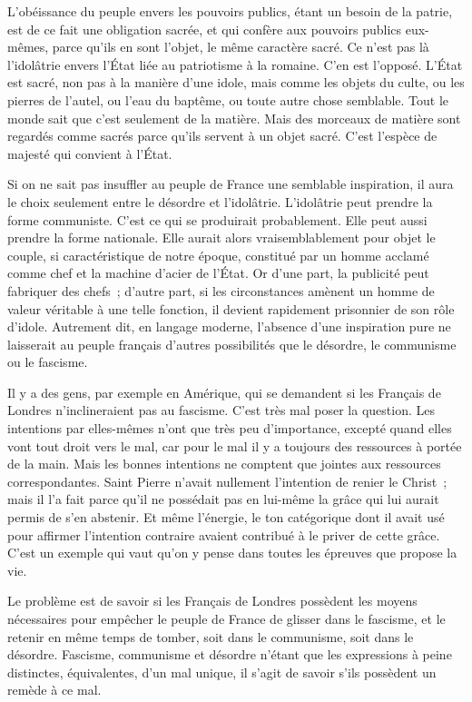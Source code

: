 \documentclass[french,twoside]{book} %
\begin{document}
L'obéissance du peuple envers les pouvoirs publics, étant un besoin de la patrie, est de ce fait une obligation sacrée, et qui confère aux pouvoirs publics eux-mêmes, parce qu'ils en sont l'objet, le même caractère sacré. Ce n'est pas là l'idolâtrie envers l'État liée au patriotisme à la romaine. C'en est l'opposé. L'État est sacré, non pas à la manière d'une idole, mais comme les objets du culte, ou les pierres de l'autel, ou l'eau du baptême, ou toute autre chose semblable. Tout le monde sait que c'est seulement de la matière. Mais des morceaux de matière sont regardés comme sacrés parce qu'ils servent à un objet sacré. C'est l'espèce de majesté qui convient à l'État.\par
Si on ne sait pas insuffler au peuple de France une semblable inspiration, il aura le choix seulement entre le désordre et l'idolâtrie. L'idolâtrie peut prendre la forme communiste. C'est ce qui se produirait probablement. Elle peut aussi prendre la forme nationale. Elle aurait alors vraisemblablement pour objet le couple, si caractéristique de notre époque, constitué par un homme acclamé comme chef et la machine d'acier de l'État. Or d'une part, la publicité peut fabriquer des chefs ; d'autre part, si les circonstances amènent un homme de valeur véritable à une telle fonction, il devient rapidement prisonnier de son rôle d'idole. Autrement dit, en langage moderne, l'absence d'une inspiration pure ne laisserait au peuple français d'autres possibilités que le désordre, le communisme ou le fascisme.\par
Il y a des gens, par exemple en Amérique, qui se demandent si les Français de Londres n'inclineraient pas au fascisme. C'est très mal poser la question. Les intentions par elles-mêmes n'ont que très peu d'importance, excepté quand elles vont tout droit vers le mal, car pour le mal il y a toujours des ressources à portée de la main. Mais les bonnes intentions ne comptent que jointes aux ressources correspondantes. Saint Pierre n'avait nullement l'intention de renier le Christ ; mais il l'a fait parce qu'il ne possédait pas en lui-même la grâce qui lui aurait permis de s'en abstenir. Et même l'énergie, le ton catégorique dont il avait usé pour affirmer l'intention contraire avaient contribué à le priver de cette grâce. C'est un exemple qui vaut qu'on y pense dans toutes les épreuves que propose la vie.\par
Le problème est de savoir si les Français de Londres possèdent les moyens nécessaires pour empêcher le peuple de France de glisser dans le fascisme, et le retenir en même temps de tomber, soit dans le communisme, soit dans le désordre. Fascisme, communisme et désordre n'étant que les expressions à peine distinctes, équivalentes, d'un mal unique, il s'agit de savoir s'ils possèdent un remède à ce mal.\par
\end{document}
